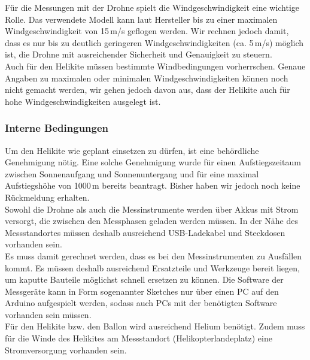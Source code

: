 \documentclass[a4paper,11pt,DIV=calc,tablecaptionabove,headinclude,twoside]{article}
\begin{document}
Für die Messungen mit der Drohne spielt die Windgeschwindigkeit eine wichtige Rolle. Das verwendete Modell kann laut Hersteller bis zu einer maximalen Windgeschwindigkeit von 15\,m/s geflogen werden. Wir rechnen jedoch damit, dass es nur bis zu deutlich geringeren Windgeschwindigkeiten (ca. 5\,m/s) möglich ist, die Drohne mit ausreichender Sicherheit und Genauigkeit zu steuern. \\

Auch für den Helikite müssen bestimmte Windbedingungen vorherrschen. Genaue Angaben zu maximalen oder minimalen Windgeschwindigkeiten können noch nicht gemacht werden, wir gehen jedoch davon aus, dass der Helikite auch für hohe Windgeschwindigkeiten ausgelegt ist. \\

\subsubsection{Interne Bedingungen}

Um den Helikite wie geplant einsetzen zu dürfen, ist eine behördliche Genehmigung nötig. Eine solche Genehmigung wurde für einen Aufstiegszeitaum zwischen Sonnenaufgang und Sonnenuntergang und für eine maximal Aufstiegshöhe von 1000\,m bereits beantragt. Bisher haben wir jedoch noch keine Rückmeldung erhalten.\\

Sowohl die Drohne als auch die Messinstrumente werden über Akkus mit Strom versorgt, die zwischen den Messphasen geladen werden müssen. In der Nähe des Messstandortes müssen deshalb ausreichend USB-Ladekabel und Steckdosen vorhanden sein.\\

Es muss damit gerechnet werden, dass es bei den Messinstrumenten zu Ausfällen kommt. Es müssen deshalb ausreichend Ersatzteile und Werkzeuge bereit liegen, um kaputte Bauteile möglichst schnell ersetzen zu können. Die Software der Messgeräte kann in Form sogenannter Sketches nur über einen PC auf den Arduino aufgespielt werden, sodass auch PCs mit der benötigten Software vorhanden sein müssen.\\

Für den Helikite bzw. den Ballon wird ausreichend Helium benötigt. Zudem muss für die Winde des Helikites am Messstandort (Helikopterlandeplatz) eine Stromversorgung vorhanden sein. \\
 
\end{document}
